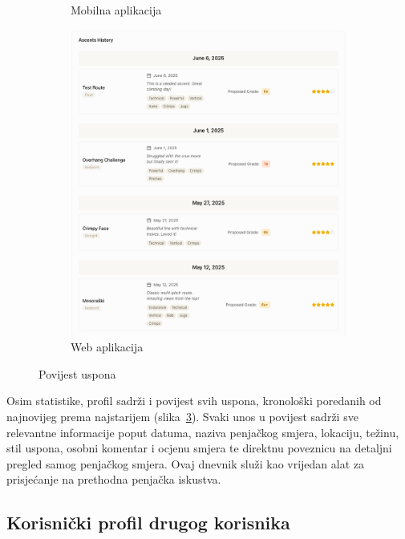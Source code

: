 \begin{figure}[H]
\begin{subfigure}[b]{0.33\textwidth}
        \caption{Mobilna aplikacija}
        \label{fig:korisnicki_profil_povijest_mob}
    \end{subfigure}
    \hfill
    \begin{subfigure}[b]{0.65\textwidth}
        \centering
        \includegraphics[width=\textwidth]{images/implementacija/web/user-profile-3.png}
        \caption{Web aplikacija}
        \label{fig:korisnicki_profil_povijest_web}
    \end{subfigure}
    \caption{Povijest uspona}
    \label{fig:korisnički_profil_3}
\end{figure}

Osim statistike, profil sadrži i povijest svih uspona, kronološki poredanih od najnovijeg prema najstarijem (slika~\ref{fig:korisnički_profil_3}). Svaki unos u povijest sadrži sve relevantne informacije poput datuma, naziva penjačkog smjera, lokaciju, težinu, stil uspona, osobni komentar i ocjenu smjera te direktnu poveznicu na detaljni pregled samog penjačkog smjera. Ovaj dnevnik služi kao vrijedan alat za prisjećanje na prethodna penjačka iskustva.

\subsection{Korisnički profil drugog korisnika}

